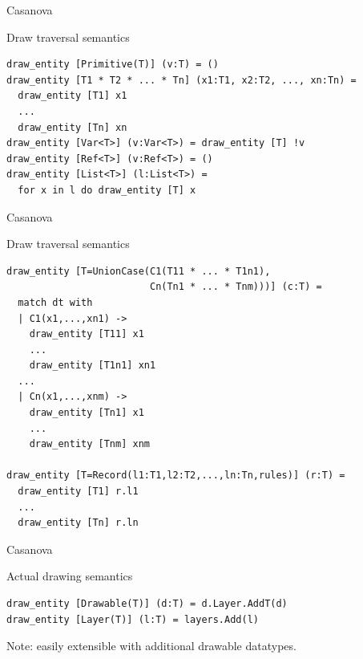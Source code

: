 \documentclass{beamer}
\begin{document}
\begin{frame}[fragile]{Casanova}
\begin{block}{Draw traversal semantics}
\begin{lstlisting}
draw_entity [Primitive(T)] (v:T) = ()
draw_entity [T1 * T2 * ... * Tn] (x1:T1, x2:T2, ..., xn:Tn) =
  draw_entity [T1] x1
  ...
  draw_entity [Tn] xn
draw_entity [Var<T>] (v:Var<T>) = draw_entity [T] !v
draw_entity [Ref<T>] (v:Ref<T>) = ()
draw_entity [List<T>] (l:List<T>) =
  for x in l do draw_entity [T] x
\end{lstlisting}
\end{block}
\end{frame}
\begin{frame}[fragile]{Casanova}
\begin{block}{Draw traversal semantics}
\begin{lstlisting}
draw_entity [T=UnionCase(C1(T11 * ... * T1n1), 
                         Cn(Tn1 * ... * Tnm)))] (c:T) =
  match dt with
  | C1(x1,...,xn1) ->
    draw_entity [T11] x1
    ...
    draw_entity [T1n1] xn1
  ...
  | Cn(x1,...,xnm) ->
    draw_entity [Tn1] x1
    ...
    draw_entity [Tnm] xnm

draw_entity [T=Record(l1:T1,l2:T2,...,ln:Tn,rules)] (r:T) =
  draw_entity [T1] r.l1
  ...
  draw_entity [Tn] r.ln
\end{lstlisting}
\end{block}
\end{frame}
\begin{frame}[fragile]{Casanova}
\begin{block}{Actual drawing semantics}
\begin{lstlisting}
draw_entity [Drawable(T)] (d:T) = d.Layer.AddT(d)
draw_entity [Layer(T)] (l:T) = layers.Add(l)
\end{lstlisting}

\footnotesize{Note: easily extensible with additional drawable datatypes.}
\end{block}
\end{frame}
\end{document}
